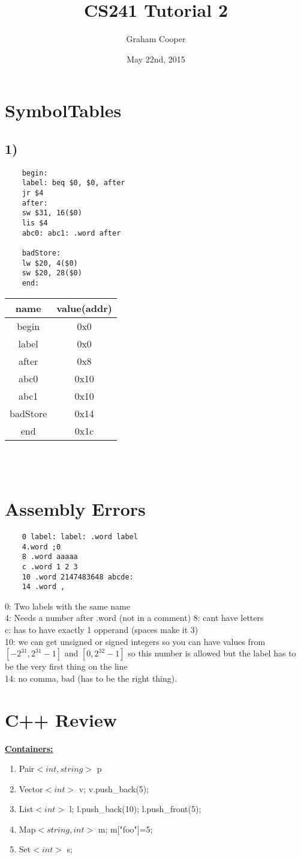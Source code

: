 \documentclass[12pt]{article}
\title{\vspace{-15ex}CS241 Tutorial 2\vspace{-1ex}}
\date{May 22nd, 2015}
\author{Graham Cooper}
\newcommand{\myt}[1]{\textbf{\underline{#1}}}
\begin{document}
	\maketitle
	
	\section*{SymbolTables}
	
	\subsection*{1)}
	\lstset{language=[mips]Assembler}
	\begin{lstlisting}
	begin:
	label: beq $0, $0, after
	jr $4
	after:
	sw $31, 16($0)
	lis $4
	abc0: abc1: .word after
	
	badStore:
	lw $20, 4($0)
	sw $20, 28($0)
	end:
	\end{lstlisting}
	
	\begin{tabular}{c | c}
		name & value(addr) \\ \hline
		begin & 0x0 \\
		label & 0x0 \\
		after & 0x8 \\
		abc0 & 0x10 \\
		abc1 & 0x10 \\
		badStore & 0x14 \\
		end & 0x1c \\
	\end{tabular}\\\\
	
	\section*{Assembly Errors}
	\lstset{language=[mips]Assembler}
	\begin{lstlisting}
	0 label: label: .word label
	4.word ;0
	8 .word aaaaa
	c .word 1 2 3
	10 .word 2147483648 abcde:
	14 .word ,
	\end{lstlisting}
	0: Two labels with the same name\\
	4: Needs a number after .word (not in a comment)
	8: cant have letters\\
	c: has to have exactly 1 opperand (spaces make it 3)\\
	10: we can get unsigned or signed integers so you can have values from $[-2^{31}, 2^{31} - 1]$ and $[0, 2^{32} - 1]$ so this number is allowed but the label has to be the very first thing on the line\\
	14: no comma, bad (has to be the right thing).\\
	
	\section*{C++ Review}
	\myt{Containers:}
	\begin{enumerate}
		\item Pair$<int, string>$ p
		\item Vector$<int>$ v; v.push\_back(5);
		\item List$<int>$ l; l.push\_back(10); l.push\_front(5);
		\item Map$<string, int>$ m; m["foo"]=5; 
		\item Set$<int>$ s;
	\end{enumerate}
	
	
	
\end{document}

